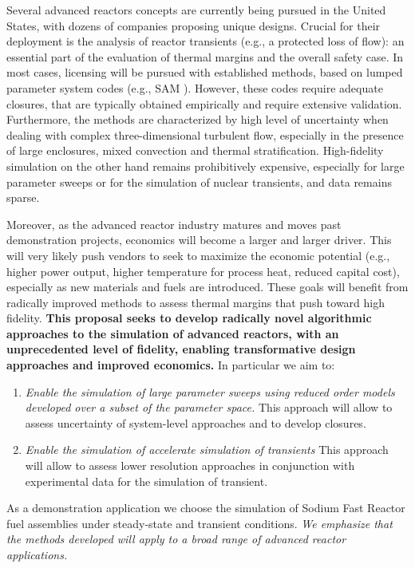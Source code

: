 Several  advanced reactors concepts are currently being pursued in the United States, with dozens of companies proposing unique designs. Crucial for their deployment is the analysis of  reactor transients (e.g., a protected loss of flow): an essential part of the evaluation of thermal margins and the overall safety case.  In most cases, licensing will be pursued with established methods, based on lumped parameter system codes (e.g., SAM \cite{hu2021}).  However, these codes require adequate closures, that are typically obtained empirically and require extensive validation. Furthermore, the methods are characterized by high level of uncertainty when dealing with complex three-dimensional turbulent flow, especially in the presence of large enclosures, mixed convection and thermal stratification. High-fidelity simulation on the other hand remains prohibitively expensive, especially for large parameter sweeps or for the simulation of nuclear transients, and data remains sparse.

Moreover, as the advanced reactor industry matures and moves past demonstration projects, economics will become a larger and larger driver. This will very likely push vendors to seek to maximize the economic potential (e.g., higher power output, higher temperature for process heat, reduced capital cost), especially as new materials and fuels are introduced. These goals will benefit from radically improved methods to assess thermal margins that push toward high fidelity. \textbf{This proposal seeks to develop radically novel algorithmic approaches to the simulation of advanced reactors, with an unprecedented level of fidelity, enabling transformative design approaches and improved economics.} In particular we aim to:
\begin{enumerate}
\item \textit{Enable the simulation of large parameter sweeps using reduced order models developed over a subset of the parameter space.} This approach will allow to assess uncertainty of system-level approaches and to develop closures.
\item \textit{Enable the simulation of accelerate simulation of transients } This approach will allow to assess lower resolution approaches in conjunction with experimental data for the simulation of transient.
\end{enumerate}
As a demonstration application we choose the simulation of Sodium Fast Reactor fuel assemblies under steady-state and transient conditions. \textit{ We emphasize that the methods developed will apply to a broad range of advanced reactor applications.}


